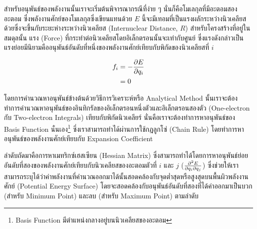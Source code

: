 สำหรับอนุพันธ์ของพลังงานนั้นเราจะเริ่มต้นพิจารณากรณีที่ง่าย ๆ นั่นก็คือโมเลกุลที่มีอะตอมสองอะตอม ซึ่งพลังงานศักย์ของโมเลกุลซึ่งเขียนแทนด้วย $E$ 
นี้จะมีเทอมที่เป็นแรงผลักระหว่างนิวเคลียสด้วยซึ่งจะขึ้นกับระยะห่างระหว่างนิวเคลียส (Internuclear Distance, $R$) สำหรับโครงสร้างที่อยู่ในสมดุลนั้น 
แรง (Force) ที่กระทำต่อนิวเคลียสโดยอิเล็กตรอนนั้นจะเท่ากับศูนย์ ซึ่งแรงดังกล่าวเป็นแรงย่อยมีนิยามคืออนุพันธ์อันดับที่หนึ่งของพลังงานศักย์เทียบกับพิกัดของนิวเคลียสที่ $i$

\begin{align}
    f_{i} &= - \pdv{E}{q_{i}} \\
    &= 0
\end{align}

โดยการคำนวณหาอนุพันธ์ข้างต้นด้วยวิธีการวิเคราะห์หรือ Analytical Method นั้นเราจะต้องทำการคำนวณหาอนุพันธ์ของอินทิกรัลของอิเล็กตรอนหนึ่งตัวและอิเล็กตรอนสองตัว
(One-electron กับ Two-electron Integrals) เทียบกับพิกัดนิวเคลียร์ นั่นคือเราจะต้องทำการหาอนุพันธ์ของ Basis Function นั่นเอง\footnote{Basis Function 
มีตำแหน่งกลางอยู่บนนิวเคลียสของอะตอม} ซึ่งเราสามารถทำได้ผ่านการใช้กฎลูกโซ่ (Chain Rule) โดยทำการหาอนุพันธ์ของพลังงานศักย์เทียบกับ Expansion Coefficient

ลำดับถัดมาคือการหาเมทริกซ์เฮสเซียน (Hessian Matrix) ซึ่งสามารถทำได้โดยการหาอนุพันธ์ย่อยอันดับที่สองของพลังงานศักย์เทียบกับนิวเคลียสของอะตอมตัวที่ $i$ และ $j$
($\pdv{E}{q_{i}}{q_{j}}$) ซึ่งช่วยให้เราสามารถระบุได้ว่าค่าพลังงานที่คำนวณออกมาได้นั้นสอดคล้องกับจุดต่ำสุดหรือสูงสุดบนพื้นผิวพลังงานศักย์ (Potential Energy Surface) 
โดยจะสอดคล้องกับอนุพันธ์อันดับที่สองที่ได้ค่าออกมาเป็นบวก (สำหรับ Minimum Point) และลบ (สำหรับ Maximum Point) ตามลำดับ
